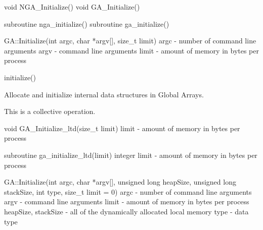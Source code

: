 \documentclass[12pt]{article}
\begin{document}

\begin{capi}
void NGA_Initialize()
void GA_Initialize()
\end{capi}

\begin{fapi}
subroutine nga_initialize()
subroutine ga_initialize()
\end{fapi}

\begin{cxxapi}
GA::Initialize(int argc, char *argv[], size_t limit)
   argc                  - number of command line arguments              \access{[input]}
   argv                  - command line arguments                        \access{[input]}
   limit                 - amount of memory in bytes per process         \access{[input]}
\end{cxxapi}

\begin{pyapi}
initialize()
\end{pyapi}

\begin{desc}

Allocate and initialize internal data structures in Global Arrays.

This is a collective operation.

\end{desc}



\begin{capi}
void GA_Initialize_ltd(size_t limit)
   limit                  - amount of memory in bytes per process         \access{[input]} 
\end{capi}

\begin{fapi}
subroutine ga_initialize_ltd(limit)
   integer limit          - amount of memory in bytes 
                            per process                                   \access{[input]} 
\end{fapi}

\begin{cxxapi}
GA::Initialize(int argc, char *argv[], unsigned long heapSize,
               unsigned long stackSize, int type, size_t limit = 0)
   argc                  - number of command line arguments               \access{[input]}
   argv                  - command line arguments                         \access{[input]}
   limit                 - amount of memory in bytes per process          \access{[input]}
   heapSize, stackSize   - all of the dynamically allocated local memory  \access{[input]}
   type                  - data type                                      \access{[input]}
\end{cxxapi}
\end{document}

